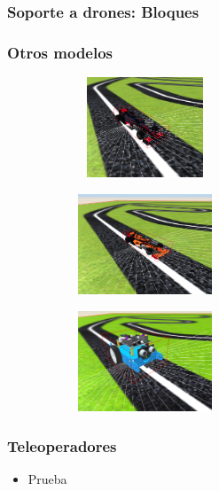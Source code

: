\documentclass[xcolor={table}]{beamer}
\begin{document}
		   
		   \begin{frame}
		\frametitle{Soporte a drones: Bloques}
		\begin{itemize}
			\end{itemize}
		\end{frame}
		\begin{frame}
			\frametitle{Otros modelos}
			          \begin{figure}[H]
        \centering
        \begin{subfigure}{\textwidth}
         \includegraphics[width=4cm, height=3cm]{img/f1_williams.png}
 \label{fig:f1williams}
        \end{subfigure}
        \begin{subfigure}{\textwidth}
         \includegraphics[width=4cm, height=3cm]{img/f1_renault.png}
   \label{fig:f1renault}
        \end{subfigure}
        \begin{subfigure}{\textwidth}
         \includegraphics[width=4cm, height=3cm]{img/mBot_model.png}
   \label{fig:mbot}
        \end{subfigure}
        \end{figure}
		\end{frame}
			\begin{frame}
			\frametitle{Teleoperadores}
	    		\begin{itemize}
				\item Prueba
			
			\end{itemize}
		\end{frame}
		
\end{document}
